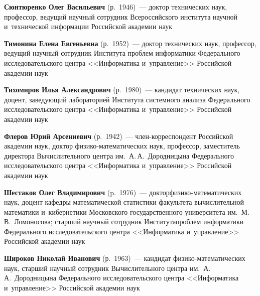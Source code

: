 \begin{multicols}{2}
\vspace*{3pt}

\noindent
\textbf{Сюнтюренко Олег Васильевич} (р.\ 1946)~--- доктор технических наук, 
профессор, ведущий научный со\-труд\-ник Всероссийского института 
научной и~технической информации Российской академии наук

\vspace*{3pt}

\noindent
\textbf{Тимонина Елена Евгеньевна} (р.\ 1952)~--- 
доктор технических наук, профессор, ведущий научный сотруд\-ник 
Института проб\-лем информатики Федерального исследовательского центра 
<<Информатика и~управ\-ле\-ние>> Российской академии наук


\columnbreak

\noindent
\textbf{Тихомиров Илья Александрович} (р.\ 1980)~--- кандидат технических наук,
 доцент, заведующий лабораторией Института сис\-тем\-но\-го анализа Федерального 
 исследовательского центра <<Информатика и~управ\-ле\-ние>> Российской академии наук

\vspace*{3pt}


\noindent
\textbf{Флеров Юрий Арсениевич} (р.\ 1942)~--- 
член-кор\-рес\-пон\-дент Российской академии наук, 
доктор фи\-зи\-ко-ма\-те\-ма\-ти\-че\-ских наук, профессор, заместитель
 директора Вычислительного центра им.\ А.\,А.~Дородницына 
 Федерального исследовательского центра <<Информатика и~управ\-ле\-ние>> 
 Российской академии наук
 
 \vspace*{3pt}

\noindent
\textbf{Шестаков Олег Владимирович} (p.\ 1976)~--- 
доктор\linebreak фи\-зи\-ко-ма\-те\-ма\-ти\-че\-ских наук, доцент кафедры математической статистики 
факультета вы\-чис\-ли\-тельной математики и~кибернетики Московского\linebreak
 го\-су\-дар\-ст\-вен\-но\-го 
университета им.\ М.\,В.~Ломоносова; старший научный сотрудник Института\linebreak проб\-лем 
информатики Федерального исследовательского центра <<Информатика и~управ\-ле\-ние>>
Российской академии наук

\vspace*{3pt}

\noindent
\textbf{Широков Николай Иванович} (р.\ 1963)~--- 
кандидат фи\-зи\-ко-ма\-те\-ма\-ти\-че\-ских наук, старший научный сотрудник 
Вычислительного центра им.\ А.\,А.~Дородницына Федерального исследовательского центра 
<<Информатика и~управ\-ле\-ние>> Российской академии наук


\end{multicols}
